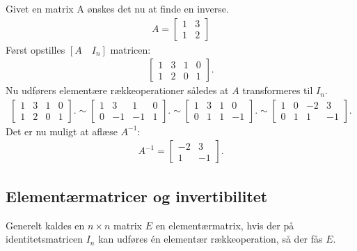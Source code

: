 \begin{eks}
Givet en matrix A ønskes det nu at finde en inverse. 
\begin{align*}
A= \begin{bmatrix}
1 & 3 \\
1 & 2
\end{bmatrix}
\end{align*}
Først opstilles $[A \quad I_n]$ matricen: 
\begin{align*}
\begin{bmatrix}
1 & 3 & 1 & 0 \\
1 & 2 & 0 & 1
\end{bmatrix}.
\end{align*}
Nu udførers elementære rækkeoperationer således at $A$ transformeres til $I_n$. 
\begin{align*}
\begin{bmatrix}
1 & 3 & 1 & 0 \\
1 & 2 & 0 & 1
\end{bmatrix}.
\sim \begin{bmatrix}
1 & 3 & 1 & 0 \\
0 & -1 & -1 & 1
\end{bmatrix}.
\sim \begin{bmatrix}
1 & 3 & 1 & 0 \\
0 & 1 & 1 & -1
\end{bmatrix}.
\sim \begin{bmatrix}
1 & 0 & -2 & 3 \\
0 & 1 & 1 & -1
\end{bmatrix}.
\end{align*}
Det er nu muligt at aflæse $A^{-1}$:
\begin{align*}
A^{-1} =\begin{bmatrix}
-2 & 3\\
1 & -1 
\end{bmatrix}.
\end{align*}
\end{eks}

\subsection{Elementærmatricer og invertibilitet}
Generelt kaldes en $n \times n$ matrix $E$ en elementærmatrix, hvis der på identitetsmatricen $I_n$ kan udføres én elementær rækkeoperation, så der fås $E$. 

